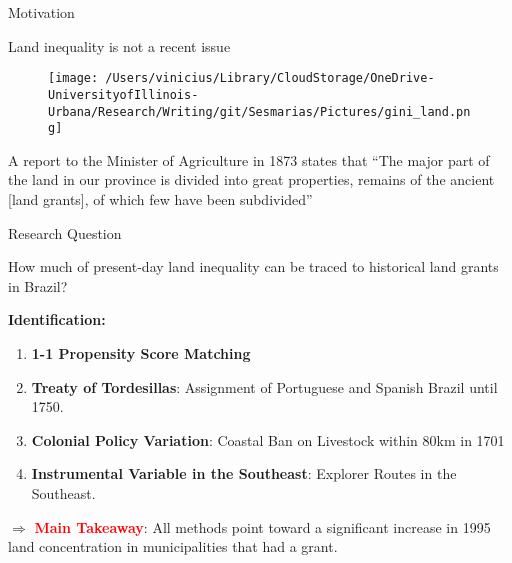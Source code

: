 \documentclass[aspectratio=1610]{beamer}
\begin{document}
\begin{frame}[t]{Motivation}
    \begin{outline}
        \1 Land inequality is not a recent issue \parencite{Alston2010-cn}
    \end{outline}
    \pause 

    \begin{figure}
        \centering
        \texttt{[image: /Users/vinicius/Library/CloudStorage/OneDrive-UniversityofIllinois-Urbana/Research/Writing/git/Sesmarias/Pictures/gini\_land.png]}
    \end{figure}

    \pause 
    \begin{outline}
    \1 A report to the Minister of Agriculture in 1873 states that ``The major part of the land in our province is divided into great properties, remains of the ancient [land grants], of which few have been subdivided''\parencite[p.~325]{Smith1972-dv}
    \end{outline}
\end{frame}

\begin{frame}{Research Question}
    \begin{outline}
        \1 How much of present-day land inequality can be traced to historical land grants in Brazil?
        \vspace{2mm}
        \pause 
    \end{outline}
    \textbf{Identification:}
    \vspace{2mm}
    \begin{enumerate}
        \item \textbf{1-1 Propensity Score Matching}
        \vspace{2mm}
        \item \textbf{Treaty of Tordesillas}: Assignment of Portuguese and Spanish Brazil until 1750. 
        \vspace{2mm}
        \item \textbf{Colonial Policy Variation}: Coastal Ban on Livestock within 80km in 1701
        \vspace{2mm}
        \item \textbf{Instrumental Variable in the Southeast}: Explorer Routes in the Southeast.
    \end{enumerate}
    \pause 
    \vspace{2mm}
    $\Rightarrow$ \textcolor{red}{\textbf{Main Takeaway}}: All methods point toward a significant increase in 1995 land concentration in municipalities that had a grant.
\end{frame}
\end{document}
